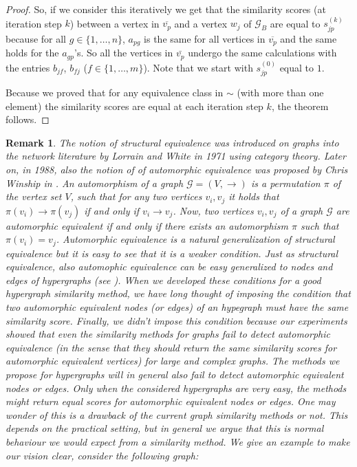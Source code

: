\documentclass[a4paper,11pt]{report}
\newtheorem{remark}[theorem]{Remark}
\newcommand{\graf}{\mathscr{G}}
\begin{document}
\begin{itemize}
\begin{proof}
   So, if we consider this iteratively we get that the similarity scores (at iteration step $k$) between a vertex in $\overline{v_p}$ and 
   a vertex $w_j$ of $\graf_B$ are equal 
   to $s^{(k)}_{jp}$ because for all $g \in 
   \{1,\ldots,n\}$, $a_{pg}$ is the same for all vertices in $\overline{v_p}$ and the same holds for the $a_{gp}$'s. 
   So all the vertices in $\bar{v_p}$ undergo the same calculations with the entries $b_{jf}$, $b_{fj}$ ($f \in \{1,\ldots,m\}$). 
   Note that we start with $s^{(0)}_{jp}$ equal to $1$. 
   
   Because we proved that for any equivalence class in $\sim$ (with more than one element) the similarity scores are equal at each iteration 
   step $k$, the theorem follows. 
\end{proof}
 
 \begin{remark}
   The notion of structural equivalence was introduced on graphs into the network 
   literature by Lorrain and White in 1971 \cite{network} using category theory. 
   Later on, in 1988, also the notion of of automorphic equivalence  was proposed by Chris 
   Winship in \cite{winship}. An automorphism  of a graph $\graf = (V,\to)$ is a permutation
   $\pi$ of the vertex set $V$, such that for any two vertices $v_i, v_j$ it holds that $\pi(v_i) \to \pi(v_j)$ if and only if $v_i \to v_j$.
   Now, two vertices $v_i, v_j$ of a graph $\graf$ are 
   automorphic equivalent if and only if 
 there exists an automorphism $\pi$ such that $\pi(v_i)=v_j$. Automorphic 
 equivalence is a natural generalization of structural equivalence but it is 
 easy to see that it is a weaker condition. Just as structural equivalence, also automophic equivalence can 
 be easy generalized to nodes and edges of hypergraphs (see \cite{auto}). When we developed these conditions 
 for a good hypergraph similarity method, we have long thought of imposing the 
 condition that two automorphic equivalent nodes (or edges) of an hypegraph must 
 have the same similarity score. Finally, we didn't impose this condition because our experiments showed that even the similarity methods for graphs 
 fail to detect automorphic equivalence (in the sense that they should return the same similarity scores for automorphic equivalent vertices)
 for large and complex graphs. The methods we propose for hypergraphs will in general also fail to detect
 automorphic equivalent nodes or edges. Only when the considered hypergraphs are very easy, the methods might return equal scores for
 automorphic equivalent nodes or edges. One may wonder of this is a drawback of the current graph similarity methods or not. This depends on the practical setting, but in general we argue that this is normal behaviour we would expect from a similarity method. We give
an example to make our vision clear, consider the following graph:


\end{remark}
\end{itemize}
\end{document}
